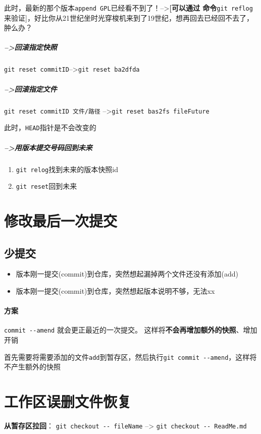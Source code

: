 \documentclass[UTF8,a4paper,12pt]{ctexbook}
\begin{document}
			此时，最新的那个版本\verb|append GPL|已经看不到了！-->\textbf{[可以通过 命令}\verb|git reflog| 来验证]，好比你从21世纪坐时光穿梭机来到了19世纪，想再回去已经回不去了，肿么办？
			
			\subparagraph{-->回滚指定快照}\verb|git reset commitID|-->\verb|git reset ba2dfda|
			
			\subparagraph{-->回滚指定文件}\verb|git reset commitID 文件/路径| -->\verb|git reset bas2fs fileFuture|
			
				此时，\verb|HEAD|指针是不会改变的
			
			\subparagraph{-->用版本提交号码回到未来}
				\begin{enumerate}[itemindent = 2em]
					\item \verb|git relog|找到未来的版本快照id 
					\item \verb|git reset|回到未来
				\end{enumerate}
				
		\section{修改最后一次提交}
			\subsection{少提交}
				\begin{itemize}
					\item 版本刚一提交(commit)到仓库，突然想起漏掉两个文件还没有添加(add)
					\item 版本刚一提交(commit)到仓库，突然想起版本说明不够，无法xx
				\end{itemize}
			
			\paragraph{方案}
			
				\verb|commit --amend| 就会更正最近的一次提交。 这样将\textbf{不会再增加额外的快照}、增加开销
				
			    首先需要将需要添加的文件\verb|add|到暂存区，然后执行\verb|git commit --amend|，这样将不产生额外的快照 
				
		
		\section{工作区误删文件恢复}
			
			\textbf{从暂存区拉回}：
			\verb|git checkout -- fileName| --> \verb|git checkout -- ReadMe.md|
			
\end{document}
